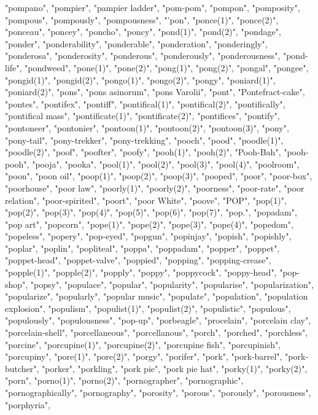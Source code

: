 "pompano",
"pompier",
"pampier ladder",
"pom-pom",
"pompon",
"pomposity",
"pompous",
"pompously",
"pompousness",
"'pon",
"ponce(1)",
"ponce(2)",
"ponceau",
"poncey",
"poncho",
"poncy",
"pond(1)",
"pond(2)",
"pondage",
"ponder",
"ponderability",
"ponderable",
"ponderation",
"ponderingly",
"ponderosa",
"ponderosity",
"ponderous",
"ponderously",
"ponderousness",
"pond-life",
"pondweed",
"pone(1)",
"pone(2)",
"pong(1)",
"pong(2)",
"pongal",
"pongee",
"pongid(1)",
"pongid(2)",
"pongo(1)",
"pongo(2)",
"pongy",
"poniard(1)",
"poniard(2)",
"pons",
"pons asinorum",
"pons Varolii",
"pont",
"Pontefract-cake",
"pontes",
"pontifex",
"pontiff",
"pontifical(1)",
"pontifical(2)",
"pontifically",
"pontifical mass",
"pontificate(1)",
"pontificate(2)",
"pontifices",
"pontify",
"pontoneer",
"pontonier",
"pontoon(1)",
"pontoon(2)",
"pontoon(3)",
"pony",
"pony-tail",
"pony-trekker",
"pony-trekking",
"pooch",
"pood",
"poodle(1)",
"poodle(2)",
"poof",
"poofter",
"poofy",
"pooh(1)",
"pooh(2)",
"Pooh-Bah",
"pooh-pooh",
"pooja",
"pooka",
"pool(1)",
"pool(2)",
"pool(3)",
"pool(4)",
"poolroom",
"poon",
"poon oil",
"poop(1)",
"poop(2)",
"poop(3)",
"pooped",
"poor",
"poor-box",
"poorhouse",
"poor law",
"poorly(1)",
"poorly(2)",
"poorness",
"poor-rate",
"poor relation",
"poor-spirited",
"poort",
"poor White",
"poove",
"POP",
"pop(1)",
"pop(2)",
"pop(3)",
"pop(4)",
"pop(5)",
"pop(6)",
"pop(7)",
"pop.",
"popadam",
"pop art",
"popcorn",
"pope(1)",
"pope(2)",
"pope(3)",
"pope(4)",
"popedom",
"popeless",
"popery",
"pop-eyed",
"popgun",
"popinjay",
"popish",
"popishly",
"poplar",
"poplin",
"popliteal",
"poppa",
"poppadam",
"popper",
"poppet",
"poppet-head",
"poppet-valve",
"poppied",
"popping",
"popping-crease",
"popple(1)",
"popple(2)",
"popply",
"poppy",
"poppycock",
"poppy-head",
"pop-shop",
"popsy",
"populace",
"popular",
"popularity",
"popularise",
"popularization",
"popularize",
"popularly",
"popular music",
"populate",
"population",
"population explosion",
"populism",
"populist(1)",
"populist(2)",
"populistic",
"populous",
"populously",
"populousness",
"pop-up",
"porbeagle",
"procelain",
"porcelain clay",
"porcelain-shell",
"porcellaneous",
"porcellanous",
"porch",
"porched",
"porchless",
"porcine",
"porcupine(1)",
"porcupine(2)",
"porcupine fish",
"porcupinish",
"porcupiny",
"pore(1)",
"pore(2)",
"porgy",
"porifer",
"pork",
"pork-barrel",
"pork-butcher",
"porker",
"porkling",
"pork pie",
"pork pie hat",
"porky(1)",
"porky(2)",
"porn",
"porno(1)",
"porno(2)",
"pornographer",
"pornographic",
"pornographically",
"pornography",
"porosity",
"porous",
"porously",
"porousness",
"porphyria",
